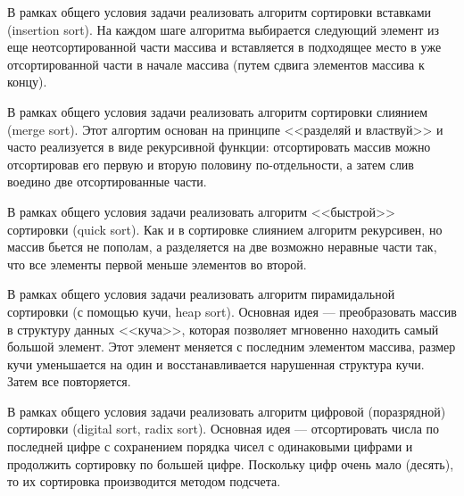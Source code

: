 \begin{zztask}
В рамках общего условия задачи реализовать алгоритм 
сортировки вставками (insertion sort). На каждом шаге алгоритма выбирается следующий 
элемент из еще неотсортированной части массива и вставляется в подходящее место в уже 
отсортированной части в начале массива (путем сдвига элементов массива к концу).
\end{zztask}

\begin{zztask}
В рамках общего условия задачи реализовать алгоритм 
сортировки слиянием (merge sort). Этот алгортим основан на принципе
<<разделяй и властвуй>> и часто реализуется в виде рекурсивной функции:
отсортировать массив можно отсортировав его первую и вторую половину 
по-отдельности, а затем слив воедино две отсортированные части.
\end{zztask}

\begin{zztask}
В рамках общего условия задачи реализовать алгоритм 
<<быстрой>> сортировки (quick sort). Как и в сортировке слиянием алгоритм
рекурсивен, но массив бьется не пополам, а разделяется на две возможно 
неравные части так, что все элементы первой меньше элементов во второй.
\end{zztask}

\begin{zztask}
В рамках общего условия задачи реализовать алгоритм 
пирамидальной сортировки (с помощью кучи, heap sort). Основная идея ---
преобразовать массив в структуру данных <<куча>>, которая позволяет мгновенно 
находить самый большой элемент. Этот элемент меняется с последним элементом 
массива, размер кучи уменьшается на один и восстанавливается нарушенная 
структура кучи. Затем все повторяется.
\end{zztask}

\begin{zztask}
В рамках общего условия задачи реализовать алгоритм 
цифровой (поразрядной) сортировки (digital sort, radix sort). Основная идея ---
отсортировать числа по последней цифре с сохранением порядка чисел с одинаковыми 
цифрами и продолжить сортировку по большей цифре. Поскольку цифр очень мало (десять), 
то их сортировка производится методом подсчета.
\end{zztask}
